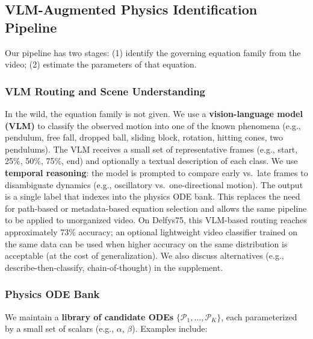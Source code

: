 \subsection{VLM-Augmented Physics Identification Pipeline}
\label{sec:vlm_pipeline}

Our pipeline has two stages: (1) identify the governing equation family from the video; (2) estimate the parameters of that equation.

\subsubsection{VLM Routing and Scene Understanding}
\label{sec:vlm_routing}

In the wild, the equation family is not given. We use a \textbf{vision-language model (VLM)} to classify the observed motion into one of the known phenomena (e.g., pendulum, free fall, dropped ball, sliding block, rotation, hitting cones, two pendulums). The VLM receives a small set of representative frames (e.g., start, 25\%, 50\%, 75\%, end) and optionally a textual description of each class. We use \textbf{temporal reasoning}: the model is prompted to compare early vs.\ late frames to disambiguate dynamics (e.g., oscillatory vs.\ one-directional motion). The output is a single label that indexes into the physics ODE bank. This replaces the need for path-based or metadata-based equation selection and allows the same pipeline to be applied to unorganized video. On Delfys75, this VLM-based routing reaches approximately 73\% accuracy; an optional lightweight video classifier trained on the same data can be used when higher accuracy on the same distribution is acceptable (at the cost of generalization). We also discuss alternatives (e.g., describe-then-classify, chain-of-thought) in the supplement.

\subsubsection{Physics ODE Bank}
\label{sec:ode_bank}

We maintain a \textbf{library of candidate ODEs} $\{\mathcal{P}_1, \ldots, \mathcal{P}_K\}$, each parameterized by a small set of scalars (e.g., $\alpha$, $\beta$). Examples include:

